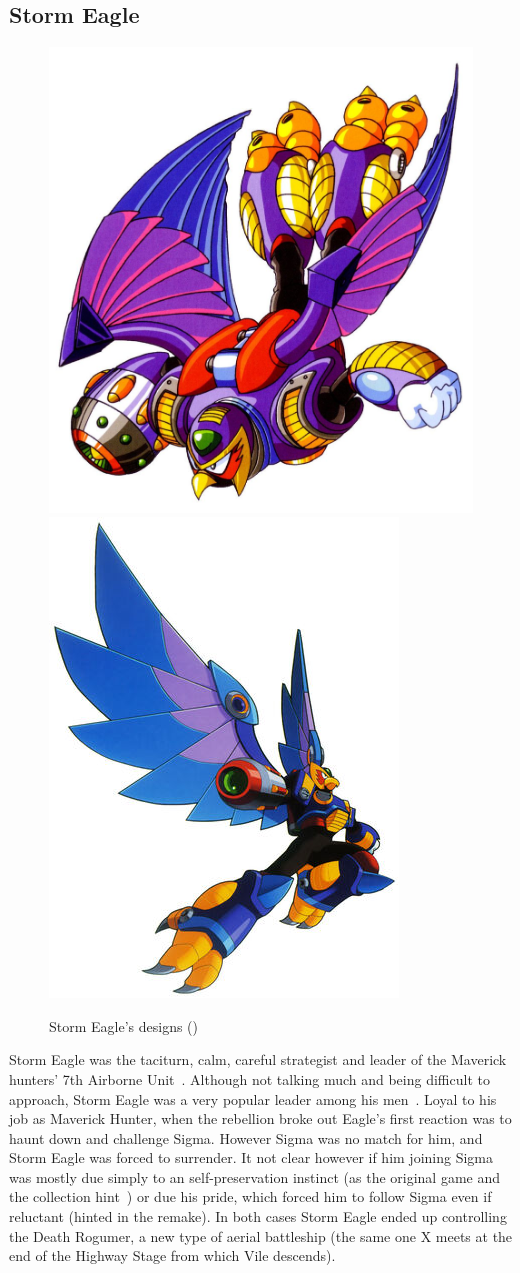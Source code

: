 \subsection{Storm Eagle}\label{boss:Storm_Eagle}
\begin{figure}[htp]
	\centering
	\includegraphics[width=0.4\linewidth]{figures/X1/Storm_eagle/Storm_Eagle.jpg}
	\includegraphics[width=0.4\linewidth]{figures/X1/Storm_eagle/MHXStormEagle.jpg}
	\caption{Storm Eagle's designs (\cite{book:MMX_Complete_art})}
\end{figure}
Storm Eagle was the taciturn, calm, careful strategist and leader of the Maverick hunters' 7th Airborne Unit~\cite{wiki:Storm_eagle}. Although not talking much and being difficult to approach, Storm Eagle was a very popular leader among his men~\cite{MHX:manual}. Loyal to his job as Maverick Hunter, when the rebellion broke out Eagle's first reaction was to haunt down and challenge Sigma. However Sigma was no match for him, and Storm Eagle was forced to surrender. It not clear however if him joining Sigma was mostly due simply to an self-preservation instinct (as the original game and the collection hint~\cite{Xcoll1:Manual_X1}) or due his pride, which forced him to follow Sigma even if reluctant (hinted in the remake). In both cases Storm Eagle ended up controlling the Death Rogumer, a new type of aerial battleship (the same one X meets at the end of the Highway Stage from which Vile descends).

